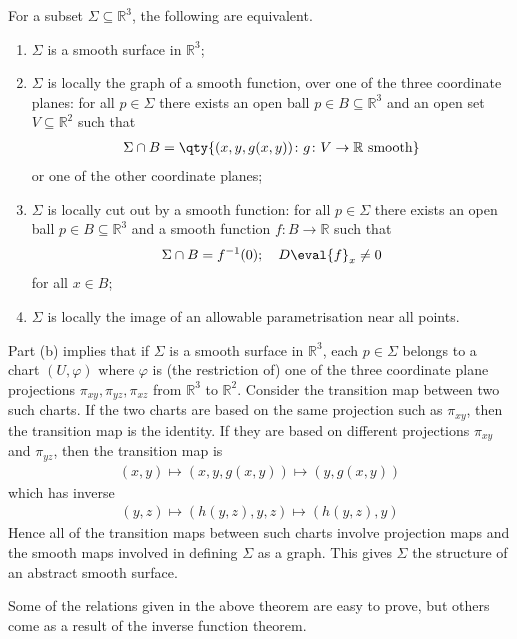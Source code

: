 \begin{theorem}
	For a subset $\Sigma \subseteq \mathbb R^3$, the following are equivalent.
	\begin{enumerate}
		\item $\Sigma$ is a smooth surface in $\mathbb R^3$;
		\item $\Sigma$ is locally the graph of a smooth function, over one of the three coordinate planes: for all $p \in \Sigma$ there exists an open ball $p \in B \subseteq \mathbb R^3$ and an open set $V \subseteq \mathbb R^2$ such that
		      \begin{align*}
			      \Sigma \cap B = \qty{(x, y, g(x,y)) \colon g \colon V \to \mathbb R \text{ smooth}}
		      \end{align*}
		      or one of the other coordinate planes;
		\item $\Sigma$ is locally cut out by a smooth function: for all $p \in \Sigma$ there exists an open ball $p \in B \subseteq \mathbb R^3$ and a smooth function $f \colon B \to \mathbb R$ such that
		      \begin{align*}
			      \Sigma \cap B = f^{-1}(0);\quad D \eval{f}_x \neq 0
		      \end{align*}
		      for all $x \in B$;
		\item $\Sigma$ is locally the image of an allowable parametrisation near all points.
	\end{enumerate}
\end{theorem}
\begin{remark}
	Part (b) implies that if $\Sigma$ is a smooth surface in $\mathbb R^3$, each $p \in \Sigma$ belongs to a chart $(U, \varphi)$ where $\varphi$ is (the restriction of) one of the three coordinate plane projections $\pi_{xy}, \pi_{yz}, \pi_{xz}$ from $\mathbb R^3$ to $\mathbb R^2$.
	Consider the transition map between two such charts.
	If the two charts are based on the same projection such as $\pi_{xy}$, then the transition map is the identity.
	If they are based on different projections $\pi_{xy}$ and $\pi_{yz}$, then the transition map is
	\begin{align*}
		(x,y) \mapsto (x,y,g(x,y)) \mapsto (y,g(x,y))
	\end{align*}
	which has inverse
	\begin{align*}
		(y,z) \mapsto (h(y,z),y,z) \mapsto (h(y,z),y)
	\end{align*}
	Hence all of the transition maps between such charts involve projection maps and the smooth maps involved in defining $\Sigma$ as a graph.
	This gives $\Sigma$ the structure of an abstract smooth surface.
\end{remark}
Some of the relations given in the above theorem are easy to prove, but others come as a result of the inverse function theorem.

